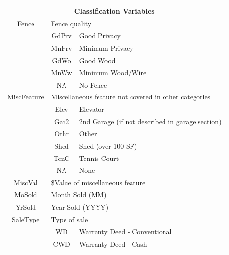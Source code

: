\documentclass[11pt]{scrartcl} %
\begin{document}
\begin{center}
\begin{tabular}{c c c c c c}
\hline
\multicolumn{6}{|c|}{Classification Variables}\\
\hline
\multicolumn{2}{|c}{Fence} & \multicolumn{4}{l|}{Fence quality}\\ 
\multicolumn{2}{|c}{} & \multicolumn{1}{c}{GdPrv} & \multicolumn{3}{l|}{Good Privacy}\\
\multicolumn{2}{|c}{} & \multicolumn{1}{c}{MnPrv} & \multicolumn{3}{l|}{Minimum Privacy}\\
\multicolumn{2}{|c}{} & \multicolumn{1}{c}{GdWo} & \multicolumn{3}{l|}{Good Wood}\\
\multicolumn{2}{|c}{} & \multicolumn{1}{c}{MnWw} & \multicolumn{3}{l|}{Minimum Wood/Wire}\\
\multicolumn{2}{|c}{} & \multicolumn{1}{c}{NA} & \multicolumn{3}{l|}{No Fence}\\
\hline
\hline
\multicolumn{2}{|c}{MiscFeature} & \multicolumn{4}{l|}{Miscellaneous feature not covered in other categories}\\ 
\multicolumn{2}{|c}{} & \multicolumn{1}{c}{Elev} & \multicolumn{3}{l|}{Elevator}\\
\multicolumn{2}{|c}{} & \multicolumn{1}{c}{Gar2} & \multicolumn{3}{l|}{2nd Garage (if not described in garage section)}\\
\multicolumn{2}{|c}{} & \multicolumn{1}{c}{Othr} & \multicolumn{3}{l|}{Other}\\
\multicolumn{2}{|c}{} & \multicolumn{1}{c}{Shed} & \multicolumn{3}{l|}{Shed (over 100 SF)}\\
\multicolumn{2}{|c}{} & \multicolumn{1}{c}{TenC} & \multicolumn{3}{l|}{Tennis Court}\\
\multicolumn{2}{|c}{} & \multicolumn{1}{c}{NA} & \multicolumn{3}{l|}{None}\\
\hline
\multicolumn{2}{|c}{MiscVal} & \multicolumn{4}{l|}{\$Value of miscellaneous feature}\\
\hline
\multicolumn{2}{|c}{MoSold} & \multicolumn{4}{l|}{Month Sold (MM)}\\
\hline
\multicolumn{2}{|c}{YrSold} & \multicolumn{4}{l|}{Year Sold (YYYY)}\\
\hline
\multicolumn{2}{|c}{SaleType} & \multicolumn{4}{l|}{Type of sale}\\ 
\multicolumn{2}{|c}{} & \multicolumn{1}{c}{WD} & \multicolumn{3}{l|}{Warranty Deed - Conventional}\\
\multicolumn{2}{|c}{} & \multicolumn{1}{c}{CWD} & \multicolumn{3}{l|}{Warranty Deed - Cash}\\

\end{tabular}
\end{center}
\end{document}
